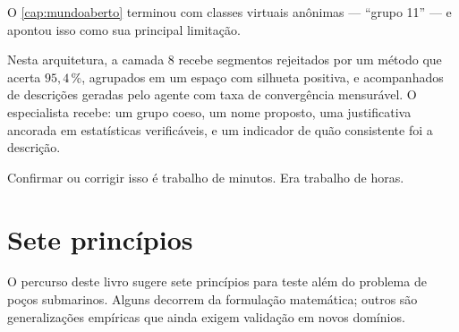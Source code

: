 \begin{destaque}
O \cref{cap:mundoaberto} terminou com classes virtuais anônimas --- ``grupo 11'' --- e
apontou isso como sua principal limitação.

Nesta arquitetura, a camada 8 recebe segmentos rejeitados por um método que acerta
$95{,}4\,\%$, agrupados em um espaço com silhueta positiva, e acompanhados de descrições
geradas pelo agente com taxa de convergência mensurável. O especialista recebe: um grupo
coeso, um nome proposto, uma justificativa ancorada em estatísticas verificáveis, e um
indicador de quão consistente foi a descrição.

Confirmar ou corrigir isso é trabalho de minutos. Era trabalho de horas.
\end{destaque}

\section{Sete princípios}

O percurso deste livro sugere sete princípios para teste além do problema de poços
submarinos. Alguns decorrem da formulação matemática; outros são generalizações
empíricas que ainda exigem validação em novos domínios.

